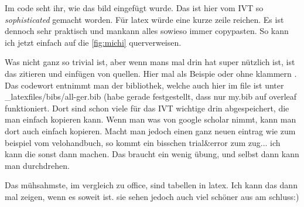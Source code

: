 Im code seht ihr, wie das bild eingefügt wurde. Das ist hier vom IVT so \emph{sophisticated} gemacht worden. Für latex würde eine kurze zeile reichen. Es ist dennoch sehr praktisch und mankann alles sowieso immer copypasten. So kann ich jetzt einfach auf die \cref{fig:michi} querverweisen.

Was nicht ganz so trivial ist, aber wenn mans mal drin hat super nützlich ist, ist das zitieren und einfügen von quellen. Hier mal als Beispie \citep{AxhausenEtAl_2002} oder ohne klammern \cite{AxhausenEtAl_2002}. Das codewort entnimmt man der bibliothek, welche auch hier im file ist unter \_latexfiles/bibs/all-ger.bib (habe gerade festgestellt, dass nur my.bib auf overleaf funktioniert.
Dort sind schon viele für das IVT wichtige drin abgespeichert, die man einfach kopieren kann. Wenn man was von google scholar nimmt, kann man dort auch einfach kopieren. 
Macht man jedoch einen ganz neuen eintrag wie zum beispiel vom velohandbuch, so kommt ein bisschen trial\&error zum zug... ich kann die sonst dann machen. Das braucht ein wenig übung, und selbst dann kann man durchdrehen. 

Das mühsahmste, im vergleich zu office, sind tabellen in latex. Ich kann das dann mal zeigen, wenn es soweit ist. sie sehen jedoch auch viel schöner aus am schluss:)

\cite{axhausen1909histologischen}